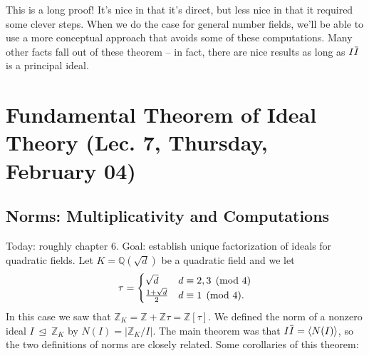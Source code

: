 \begin{remark}

This is a long proof! It's nice in that it's direct, but less nice in
that it required some clever steps. When we do the case for general
number fields, we'll be able to use a more conceptual approach that
avoids some of these computations. Many other facts fall out of these
theorem -- in fact, there are nice results as long as
\(I \mkern 1.5mu\overline{\mkern-1.5muI\mkern-1.5mu}\mkern 1.5mu\) is a
principal ideal.

\end{remark}

\hypertarget{fundamental-theorem-of-ideal-theory-lec.-7-thursday-february-04}{%
\section{Fundamental Theorem of Ideal Theory (Lec. 7, Thursday, February
04)}\label{fundamental-theorem-of-ideal-theory-lec.-7-thursday-february-04}}

\hypertarget{norms-multiplicativity-and-computations}{%
\subsection{Norms: Multiplicativity and
Computations}\label{norms-multiplicativity-and-computations}}

\begin{remark}

Today: roughly chapter 6. Goal: establish unique factorization of ideals
for quadratic fields. Let \(K = {\mathbb{Q}}(\sqrt d)\) be a quadratic
field and we let
\begin{align*}
\tau = 
\begin{cases}
\sqrt d & d \equiv 2,3 \pmod 4  
\\
{1 + \sqrt{d} \over 2} & d \equiv 1 \pmod 4.
\end{cases}
\end{align*}
In this case we saw that
\({\mathbb{Z}}_K = {\mathbb{Z}}+ {\mathbb{Z}}\tau = {\mathbb{Z}}[\tau]\).
We defined the norm of a nonzero ideal
\(I{~\trianglelefteq~}{\mathbb{Z}}_K\) by
\(N(I) = {\left\lvert {{\mathbb{Z}}_K/I} \right\rvert}\). The main
theorem was that
\(I \mkern 1.5mu\overline{\mkern-1.5muI\mkern-1.5mu}\mkern 1.5mu = \left\langle{ N(I)}\right\rangle\),
so the two definitions of norms are closely related. Some corollaries of
this theorem:

\end{remark}

